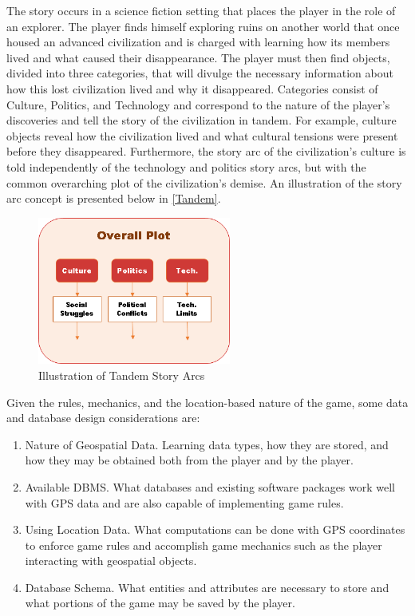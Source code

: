 \documentclass[conference]{IEEEtran}
\begin{document}
The story occurs in a science fiction setting that places the player in the role of an explorer. The player finds himself exploring ruins on another world that once housed an advanced civilization and is charged with learning how its members lived and what caused their disappearance. The player must then find objects, divided into three categories, that will divulge the necessary information about how this lost civilization lived and why it disappeared. Categories consist of Culture, Politics, and Technology and correspond to the nature of the player’s discoveries and tell the story of the civilization in tandem. For example, culture objects reveal how the civilization lived and what cultural tensions were present before they disappeared. Furthermore, the story arc of the civilization’s culture is told independently of the technology and politics story arcs, but with the common overarching plot of the civilization’s demise. An illustration of the story arc concept is presented below in \autoref{Tandem}.

\begin{figure}[h]
\centering
\includegraphics[width=2.5in]{imgs/TandemPlot2.png}
\caption{Illustration of Tandem Story Arcs}
\label{Tandem}
\end{figure}

Given the rules, mechanics, and the location-based nature of the game, some data and database design considerations are:

\begin{enumerate}
	\item Nature of Geospatial Data. Learning data types, how they are stored, and how they may be obtained both from the player and by the player.
	\item Available DBMS. What databases and existing software packages work well with GPS data and are also capable of implementing game rules.
	\item Using Location Data. What computations can be done with GPS coordinates to enforce game rules and accomplish game mechanics such as the player interacting with geospatial objects.
	\item Database Schema. What entities and attributes are necessary to store and what portions of the game may be saved by the player.
\end{enumerate}
\end{document}
